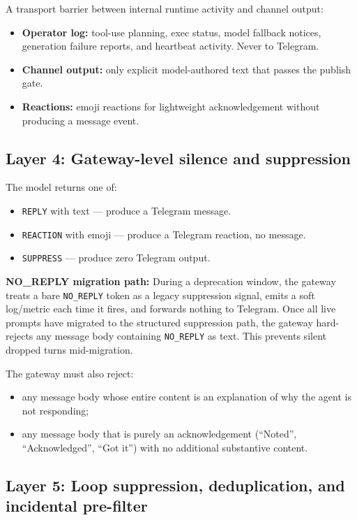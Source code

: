 \documentclass[11pt]{article}
\begin{document}
A transport barrier between internal runtime activity and channel output:

\begin{itemize}
\item \textbf{Operator log:} tool-use planning, exec status, model fallback
notices, generation failure reports, and heartbeat activity.  Never to Telegram.
\item \textbf{Channel output:} only explicit model-authored text that passes
the publish gate.
\item \textbf{Reactions:} emoji reactions for lightweight acknowledgement
without producing a message event.
\end{itemize}

\subsection{Layer 4: Gateway-level silence and suppression}

The model returns one of:
\begin{itemize}
\item \texttt{REPLY} with text --- produce a Telegram message.
\item \texttt{REACTION} with emoji --- produce a Telegram reaction, no message.
\item \texttt{SUPPRESS} --- produce zero Telegram output.
\end{itemize}

\textbf{NO\_REPLY migration path:} During a deprecation window, the gateway
treats a bare \texttt{NO\_REPLY} token as a legacy suppression signal, emits a
soft log/metric each time it fires, and forwards nothing to Telegram.  Once all
live prompts have migrated to the structured suppression path, the gateway
hard-rejects any message body containing \texttt{NO\_REPLY} as text.  This
prevents silent dropped turns mid-migration.

The gateway must also reject:
\begin{itemize}
\item any message body whose entire content is an explanation of why the agent
is not responding;
\item any message body that is purely an acknowledgement (``Noted'',
``Acknowledged'', ``Got it'') with no additional substantive content.
\end{itemize}

\subsection{Layer 5: Loop suppression, deduplication, and incidental pre-filter}
\end{document}
